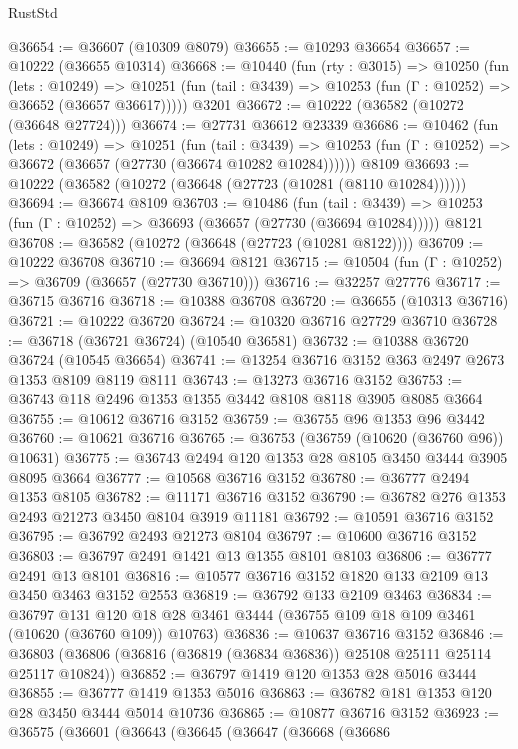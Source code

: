 \begin{lexlean}{RustStd}
\begin{coremodule}
@36654 := @36607 (@10309 @8079)
@36655 := @10293 @36654
@36657 := @10222 (@36655 @10314)
@36668 := @10440
    (fun (rty : @3015) =>
    @10250
      (fun (lets : @10249) =>
      @10251 (fun (tail : @3439) => @10253 (fun (Γ : @10252) => @36652 (@36657 @36617)))))
    @3201
@36672 := @10222 (@36582 (@10272 (@36648 @27724)))
@36674 := @27731 @36612 @23339
@36686 := @10462
    (fun (lets : @10249) =>
    @10251
      (fun (tail : @3439) =>
      @10253 (fun (Γ : @10252) => @36672 (@36657 (@27730 (@36674 @10282 @10284))))))
    @8109
@36693 := @10222 (@36582 (@10272 (@36648 (@27723 (@10281 (@8110 @10284))))))
@36694 := @36674 @8109
@36703 := @10486
    (fun (tail : @3439) => @10253 (fun (Γ : @10252) => @36693 (@36657 (@27730 (@36694 @10284)))))
    @8121
@36708 := @36582 (@10272 (@36648 (@27723 (@10281 @8122))))
@36709 := @10222 @36708
@36710 := @36694 @8121
@36715 := @10504 (fun (Γ : @10252) => @36709 (@36657 (@27730 @36710)))
@36716 := @32257 @27776
@36717 := @36715 @36716
@36718 := @10388 @36708
@36720 := @36655 (@10313 @36716)
@36721 := @10222 @36720
@36724 := @10320 @36716 @27729 @36710
@36728 := @36718 (@36721 @36724) (@10540 @36581)
@36732 := @10388 @36720 @36724 (@10545 @36654)
@36741 := @13254 @36716 @3152 @363 @2497 @2673 @1353 @8109 @8119 @8111
@36743 := @13273 @36716 @3152
@36753 := @36743 @118 @2496 @1353 @1355 @3442 @8108 @8118 @3905 @8085 @3664
@36755 := @10612 @36716 @3152
@36759 := @36755 @96 @1353 @96 @3442
@36760 := @10621 @36716
@36765 := @36753 (@36759 (@10620 (@36760 @96)) @10631)
@36775 := @36743 @2494 @120 @1353 @28 @8105 @3450 @3444 @3905 @8095 @3664
@36777 := @10568 @36716 @3152
@36780 := @36777 @2494 @1353 @8105
@36782 := @11171 @36716 @3152
@36790 := @36782 @276 @1353 @2493 @21273 @3450 @8104 @3919 @11181
@36792 := @10591 @36716 @3152
@36795 := @36792 @2493 @21273 @8104
@36797 := @10600 @36716 @3152
@36803 := @36797 @2491 @1421 @13 @1355 @8101 @8103
@36806 := @36777 @2491 @13 @8101
@36816 := @10577 @36716 @3152 @1820 @133 @2109 @13 @3450 @3463 @3152 @2553
@36819 := @36792 @133 @2109 @3463
@36834 := @36797
    @131
    @120
    @18
    @28
    @3461
    @3444
    (@36755 @109 @18 @109 @3461 (@10620 (@36760 @109)) @10763)
@36836 := @10637 @36716 @3152
@36846 := @36803 (@36806 (@36816 (@36819 (@36834 @36836)) @25108 @25111 @25114 @25117 @10824))
@36852 := @36797 @1419 @120 @1353 @28 @5016 @3444
@36855 := @36777 @1419 @1353 @5016
@36863 := @36782 @181 @1353 @120 @28 @3450 @3444 @5014 @10736
@36865 := @10877 @36716 @3152
@36923 := @36575
    (@36601
      (@36643
        (@36645
          (@36647
            (@36668
              (@36686

\end{coremodule}
\end{lexlean}
